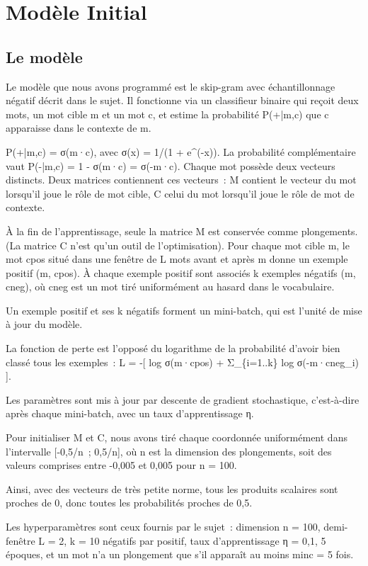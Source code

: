 \documentclass[11pt,a4paper]{article}
\begin{document}
\section{Modèle Initial}

\subsection*{Le modèle}

Le modèle que nous avons programmé est le skip-gram avec échantillonnage négatif décrit dans le sujet. Il fonctionne via un classifieur binaire qui reçoit deux mots, un mot cible m et un mot c, et estime la probabilité P(+|m,c) que c apparaisse dans le contexte de m.

P(+|m,c) = σ(m·c), avec σ(x) = 1/(1 + e\textasciicircum{}(-x)). La probabilité complémentaire vaut P(-|m,c) = 1 - σ(m·c) = σ(-m·c). Chaque mot possède deux vecteurs distincts. Deux matrices contiennent ces vecteurs~: M contient le vecteur du mot lorsqu’il joue le rôle de mot cible, C celui du mot lorsqu’il joue le rôle de mot de contexte.

À la fin de l’apprentissage, seule la matrice M est conservée comme plongements. (La matrice C n’est qu’un outil de l’optimisation). Pour chaque mot cible m, le mot cpos situé dans une fenêtre de L mots avant et après m donne un exemple positif (m, cpos). À chaque exemple positif sont associés k exemples négatifs (m, cneg), où cneg est un mot tiré uniformément au hasard dans le vocabulaire.

Un exemple positif et ses k négatifs forment un mini-batch, qui est l’unité de mise à jour du modèle.

La fonction de perte est l’opposé du logarithme de la probabilité d’avoir bien classé tous les exemples~: L = -[ log σ(m·cpos) + Σ\_\{i=1..k\} log σ(-m·cneg\_i) ].

Les paramètres sont mis à jour par descente de gradient stochastique, c’est-à-dire après chaque mini-batch, avec un taux d’apprentissage η.

Pour initialiser M et C, nous avons tiré chaque coordonnée uniformément dans l’intervalle [-0,5/n~; 0,5/n], où n est la dimension des plongements, soit des valeurs comprises entre -0,005 et 0,005 pour n = 100.

Ainsi, avec des vecteurs de très petite norme, tous les produits scalaires sont proches de 0, donc toutes les probabilités proches de 0,5.

Les hyperparamètres sont ceux fournis par le sujet~: dimension n = 100, demi-fenêtre L = 2, k = 10 négatifs par positif, taux d’apprentissage η = 0,1, 5 époques, et un mot n’a un plongement que s’il apparaît au moins minc = 5 fois.
\end{document}
